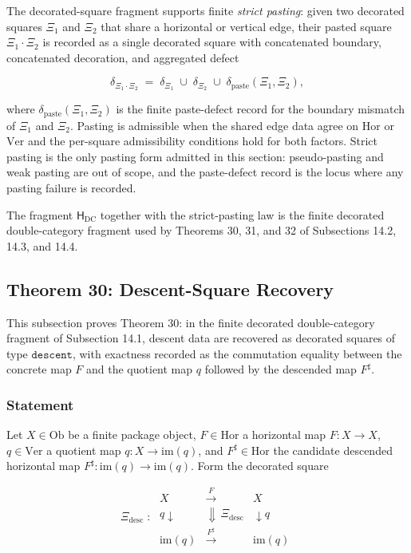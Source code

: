 \documentclass[11pt]{article}
\theoremstyle{definition}
\begin{document}
The decorated-square fragment supports finite \emph{strict pasting}: given two decorated squares \(\Xi_{1}\) and \(\Xi_{2}\) that share a horizontal or vertical edge, their pasted square \(\Xi_{1}\cdot\Xi_{2}\) is recorded as a single decorated square with concatenated boundary, concatenated decoration, and aggregated defect

\[
\delta_{\Xi_{1}\cdot\Xi_{2}}\;=\;\delta_{\Xi_{1}}\;\cup\;\delta_{\Xi_{2}}\;\cup\;\delta_{\mathrm{paste}}(\Xi_{1},\Xi_{2}),
\]

where \(\delta_{\mathrm{paste}}(\Xi_{1},\Xi_{2})\) is the finite paste-defect record for the boundary mismatch of \(\Xi_{1}\) and \(\Xi_{2}\). Pasting is admissible when the shared edge data agree on \(\mathrm{Hor}\) or \(\mathrm{Ver}\) and the per-square admissibility conditions hold for both factors. Strict pasting is the only pasting form admitted in this section: pseudo-pasting and weak pasting are out of scope, and the paste-defect record is the locus where any pasting failure is recorded.

The fragment \(\mathsf H_{\mathrm{DC}}\) together with the strict-pasting law is the finite decorated double-category fragment used by Theorems 30, 31, and 32 of Subsections 14.2, 14.3, and 14.4.

\subsection{Theorem 30: Descent-Square Recovery}

This subsection proves Theorem 30: in the finite decorated double-category fragment of Subsection 14.1, descent data are recovered as decorated squares of type \(\texttt{descent}\), with exactness recorded as the commutation equality between the concrete map \(F\) and the quotient map \(q\) followed by the descended map \(F^{\sharp}\).

\subsubsection{Statement}

Let \(X\in\mathrm{Ob}\) be a finite package object, \(F\in\mathrm{Hor}\) a horizontal map \(F:X\to X\), \(q\in\mathrm{Ver}\) a quotient map \(q:X\to\mathrm{im}(q)\), and \(F^{\sharp}\in\mathrm{Hor}\) the candidate descended horizontal map \(F^{\sharp}:\mathrm{im}(q)\to\mathrm{im}(q)\). Form the decorated square

\[
\Xi_{\mathrm{desc}}\;:\;
\begin{array}{ccc}
X & \xrightarrow{F} & X\\
{\scriptstyle q}\downarrow & \Downarrow\,\Xi_{\mathrm{desc}} & \downarrow{\scriptstyle q}\\
\mathrm{im}(q) & \xrightarrow{F^{\sharp}} & \mathrm{im}(q)
\end{array}
\]
\end{document}
